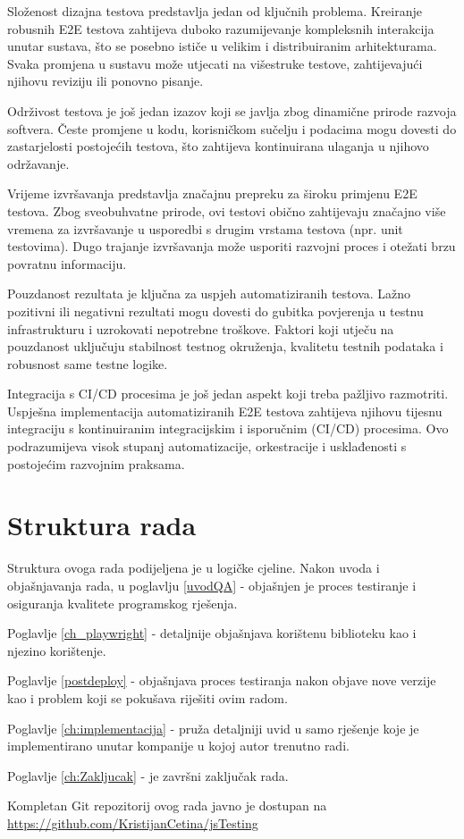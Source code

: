Složenost dizajna testova predstavlja jedan od ključnih problema.
Kreiranje robusnih E2E testova zahtijeva duboko razumijevanje kompleksnih interakcija unutar sustava, što se posebno ističe u velikim i distribuiranim arhitekturama.
Svaka promjena u sustavu može utjecati na višestruke testove, zahtijevajući njihovu reviziju ili ponovno pisanje.

Održivost testova je još jedan izazov koji se javlja zbog dinamične prirode razvoja softvera.
Česte promjene u kodu, korisničkom sučelju i podacima mogu dovesti do zastarjelosti postojećih testova, što zahtijeva kontinuirana ulaganja u njihovo održavanje.

Vrijeme izvršavanja predstavlja značajnu prepreku za široku primjenu E2E testova.
Zbog sveobuhvatne prirode, ovi testovi obično zahtijevaju značajno više vremena za izvršavanje u usporedbi s drugim vrstama testova (npr. unit testovima).
Dugo trajanje izvršavanja može usporiti razvojni proces i otežati brzu povratnu informaciju.

Pouzdanost rezultata je ključna za uspjeh automatiziranih testova.
Lažno pozitivni ili negativni rezultati mogu dovesti do gubitka povjerenja u testnu infrastrukturu i uzrokovati nepotrebne troškove.
Faktori koji utječu na pouzdanost uključuju stabilnost testnog okruženja, kvalitetu testnih podataka i robusnost same testne logike.

Integracija s CI/CD procesima je još jedan aspekt koji treba pažljivo razmotriti.
Uspješna implementacija automatiziranih E2E testova zahtijeva njihovu tijesnu integraciju s kontinuiranim integracijskim i isporučnim (CI/CD) procesima.
Ovo podrazumijeva visok stupanj automatizacije, orkestracije i usklađenosti s postojećim razvojnim praksama.

\section*{Struktura rada}
Struktura ovoga rada podijeljena je u logičke cjeline.
Nakon uvoda i objašnjavanja rada, u poglavlju \ref{uvodQA} -  objašnjen je proces testiranje i osiguranja kvalitete programskog rješenja.

Poglavlje \ref{ch_playwright} -  detaljnije objašnjava korištenu biblioteku kao i njezino korištenje.

Poglavlje \ref{postdeploy} -  objašnjava proces testiranja nakon objave nove verzije kao i problem koji se pokušava riješiti ovim radom.

Poglavlje \ref{ch:implementacija} -  pruža detaljniji uvid u samo rješenje koje je implementirano unutar kompanije u kojoj autor trenutno radi.

Poglavlje \ref{ch:Zakljucak} -  je završni zaključak rada.

Kompletan Git repozitorij ovog rada javno je dostupan na \url{https://github.com/KristijanCetina/jsTesting}